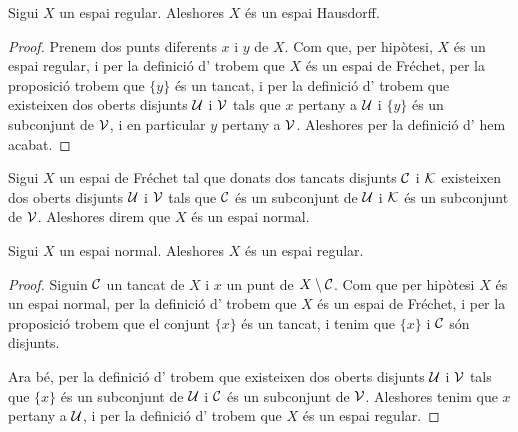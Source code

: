 \documentclass[../Apunts.tex]{subfiles}
\begin{document}
	\begin{proposition}
		Sigui \(X\) un espai regular. Aleshores \(X\) és un espai Hausdorff.
		\begin{proof}
			Prenem dos punts diferents \(x\) i \(y\) de \(X\). Com que, per hipòtesi, \(X\) és un espai regular, i per la definició d' trobem que \(X\) és un espai de Fréchet, per la proposició  trobem que \(\{y\}\) és un tancat, i per la definició d' trobem que existeixen dos oberts disjunts \(\mathcal{U}\) i \(\mathcal{V}\) tals que \(x\) pertany a \(\mathcal{U}\) i \(\{y\}\) és un subconjunt de \(\mathcal{V}\), i en particular \(y\) pertany a \(\mathcal{V}\). Aleshores per la definició d' hem acabat.
		\end{proof}
	\end{proposition}
	\begin{definition}
		\label{def:espai normal}
		Sigui \(X\) un espai de Fréchet tal que donats dos tancats disjunts \(\mathcal{C}\) i \(\mathcal{K}\) existeixen dos oberts disjunts \(\mathcal{U}\) i \(\mathcal{V}\) tals que \(\mathcal{C}\) és un subconjunt de \(\mathcal{U}\) i \(\mathcal{K}\) és un subconjunt de \(\mathcal{V}\). Aleshores direm que \(X\) és un espai normal.
	\end{definition}
	\begin{proposition}
		\label{prop:els espais normals són espais regulars}
		Sigui \(X\) un espai normal. Aleshores \(X\) és un espai regular.
		\begin{proof}
			Siguin \(\mathcal{C}\) un tancat de \(X\) i \(x\) un punt de \(X\setminus\mathcal{C}\). Com que per hipòtesi \(X\) és un espai normal, per la definició d' trobem que \(X\) és un espai de Fréchet, i per la proposició  trobem que el conjunt \(\{x\}\) és un tancat, i tenim que \(\{x\}\) i \(\mathcal{C}\) són disjunts.
			
			Ara bé, per la definició d' trobem que existeixen dos oberts disjunts \(\mathcal{U}\) i \(\mathcal{V}\) tals que \(\{x\}\) és un subconjunt de \(\mathcal{U}\) i \(\mathcal{C}\) és un subconjunt de \(\mathcal{V}\). Aleshores tenim que \(x\) pertany a \(\mathcal{U}\), i per la definició d' trobem que \(X\) és un espai regular.
		\end{proof}
	\end{proposition}
\end{document}
